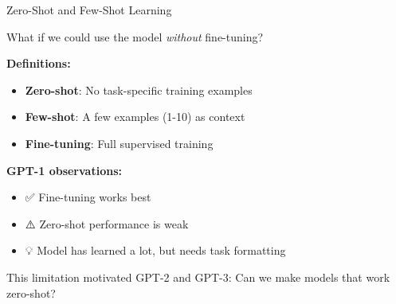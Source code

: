 \documentclass[aspectratio=169]{beamer}
\begin{document}
\begin{frame}[shrink=10]{Zero-Shot and Few-Shot Learning 🎯}
\small
    \begin{discussion}
        What if we could use the model \textit{without} fine-tuning?
    \end{discussion}

    \vspace{0.3cm}

    \textbf{Definitions:}
    \begin{itemize}\setlength{\itemsep}{0pt}
        \item \textbf{Zero-shot}: No task-specific training examples
        \item \textbf{Few-shot}: A few examples (1-10) as context
        \item \textbf{Fine-tuning}: Full supervised training
    \end{itemize}

    \vspace{0.3cm}

    \textbf{GPT-1 observations:}
    \begin{itemize}\setlength{\itemsep}{0pt}
        \item ✅ Fine-tuning works best
        \item ⚠️ Zero-shot performance is weak
        \item 💡 Model has learned a lot, but needs task formatting
    \end{itemize}

    \vspace{0.3cm}

    \begin{thinkaboutit}
        This limitation motivated GPT-2 and GPT-3: Can we make models that work zero-shot?
    \end{thinkaboutit}
\end{frame}
\end{document}
